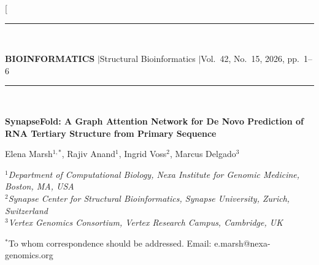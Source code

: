 \documentclass[10pt,twoside]{article}
\begin{document}
\twocolumn[
{\centering
{\color{oxfordblue}\rule{\linewidth}{1.4pt}}\\[3pt]
{\small\color{meridiangray}\textbf{BIOINFORMATICS} \quad$\vert$\quad Structural Bioinformatics \quad$\vert$\quad Vol.~42, No.~15, 2026, pp.~1--6\par}
\vspace{2pt}
{\color{synapseteal}\rule{\linewidth}{0.6pt}}\\[16pt]

{\LARGE\bfseries\color{oxfordblue}
SynapseFold: A Graph Attention Network for De Novo Prediction of RNA Tertiary Structure from Primary Sequence\par}
\vspace{12pt}

{\normalsize Elena Marsh$^{1,\ast}$, Rajiv Anand$^{1}$, Ingrid Voss$^{2}$, Marcus Delgado$^{3}$\par}
\vspace{5pt}
{\small\itshape
$^{1}$Department of Computational Biology, Nexa Institute for Genomic Medicine, Boston, MA, USA\\
$^{2}$Synapse Center for Structural Bioinformatics, Synapse University, Zurich, Switzerland\\
$^{3}$Vertex Genomics Consortium, Vertex Research Campus, Cambridge, UK\par}
\vspace{6pt}
{\small $^{\ast}$To whom correspondence should be addressed. Email: e.marsh@nexa-genomics.org\par}
\vspace{16pt}
}
\end{document}
